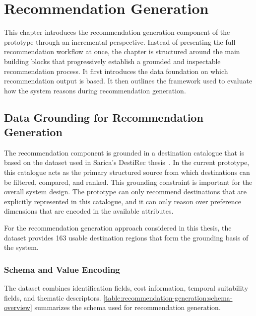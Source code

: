 
\chapter{Recommendation Generation}\label{chapter:recommendation-generation}

This chapter introduces the recommendation generation component of the prototype through an incremental perspective. Instead of presenting the full recommendation workflow at once, the chapter is structured around the main building blocks that progressively establish a grounded and inspectable recommendation process. It first introduces the data foundation on which recommendation output is based. It then outlines the framework used to evaluate how the system reasons during recommendation generation.

\section{Data Grounding for Recommendation Generation}\label{section:recommendation-generation:data-grounding}

The recommendation component is grounded in a destination catalogue that is based on the dataset used in Sarica's DestiRec thesis~\parencite{saricaDestirec}. In the current prototype, this catalogue acts as the primary structured source from which destinations can be filtered, compared, and ranked. This grounding constraint is important for the overall system design. The prototype can only recommend destinations that are explicitly represented in this catalogue, and it can only reason over preference dimensions that are encoded in the available attributes.

For the recommendation generation approach considered in this thesis, the dataset provides 163 usable destination regions that form the grounding basis of the system.

\subsection{Schema and Value Encoding}\label{subsection:recommendation-generation:data-grounding:schema}

The dataset combines identification fields, cost information, temporal suitability fields, and thematic descriptors. \autoref{table:recommendation-generation:schema-overview} summarizes the schema used for recommendation generation.

